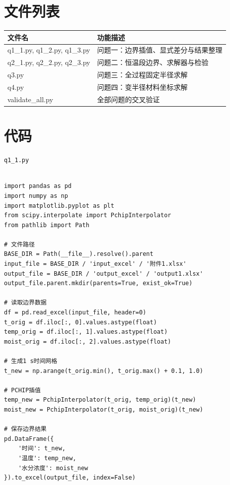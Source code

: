 \documentclass[withoutpreface,bwprint]{cumcm_thesis}
\begin{document}
\newpage
\begin{appendices}
\section{文件列表}
\begin{table}[H]
\centering
\begin{tabularx}{\textwidth}{LL}
\toprule
文件名   & 功能描述 \\
\midrule
 q1\_1.py, q1\_2.py, q1\_3.py & 问题一：边界插值、显式差分与结果整理 \\
 q2\_1.py, q2\_2.py, q2\_3.py & 问题二：恒温段边界、求解器与检验 \\
 q3.py & 问题三：全过程固定半径求解 \\
 q4.py & 问题四：变半径材料坐标求解 \\
 validate\_all.py & 全部问题的交叉验证 \\
\bottomrule
\end{tabularx}
\label{tab:文件列表}
\end{table}

\iffalse
\section{代码}

\noindent\texttt{q1\_1.py}
\begin{lstlisting}
    
import pandas as pd
import numpy as np
import matplotlib.pyplot as plt
from scipy.interpolate import PchipInterpolator
from pathlib import Path

# 文件路径
BASE_DIR = Path(__file__).resolve().parent
input_file = BASE_DIR / 'input_excel' / '附件1.xlsx'
output_file = BASE_DIR / 'output_excel' / 'output1.xlsx'
output_file.parent.mkdir(parents=True, exist_ok=True)

# 读取边界数据
df = pd.read_excel(input_file, header=0)
t_orig = df.iloc[:, 0].values.astype(float)
temp_orig = df.iloc[:, 1].values.astype(float)
moist_orig = df.iloc[:, 2].values.astype(float)

# 生成1 s时间网格
t_new = np.arange(t_orig.min(), t_orig.max() + 0.1, 1.0)

# PCHIP插值
temp_new = PchipInterpolator(t_orig, temp_orig)(t_new)
moist_new = PchipInterpolator(t_orig, moist_orig)(t_new)

# 保存边界结果
pd.DataFrame({
    '时间': t_new, 
    '温度': temp_new, 
    '水分浓度': moist_new
}).to_excel(output_file, index=False)


\end{lstlisting}
\end{appendices}
\end{document}
